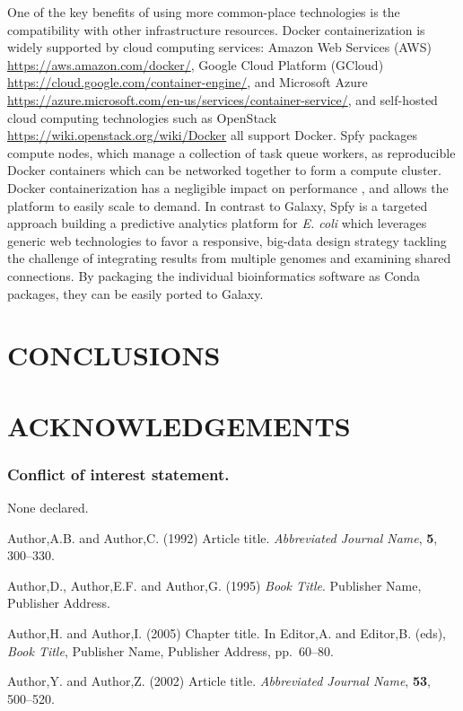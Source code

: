 \documentclass[a4,center,fleqn]{NAR}
\begin{document}
One of the key benefits of using more common-place technologies is the compatibility with other infrastructure resources.
Docker containerization is widely supported by cloud computing services: Amazon Web Services (AWS) \url{https://aws.amazon.com/docker/}, Google Cloud Platform (GCloud) \url{https://cloud.google.com/container-engine/}, and Microsoft Azure \url{https://azure.microsoft.com/en-us/services/container-service/}, and self-hosted cloud computing technologies such as OpenStack \url{https://wiki.openstack.org/wiki/Docker} all support Docker.
Spfy packages compute nodes, which manage a collection of task queue workers, as reproducible Docker containers which can be networked together to form a compute cluster.
Docker containerization has a negligible impact on performance \citep{di2015impact}, and allows the platform to easily scale to demand.
In contrast to Galaxy, Spfy is a targeted approach building a predictive analytics platform for \textit{E. coli} which leverages generic web technologies to favor a responsive, big-data design strategy tackling the challenge \citep{fricke2014bacterial} of integrating results from multiple genomes and examining shared connections.
By packaging the individual bioinformatics software as Conda packages, they can be easily ported to Galaxy.

\section{CONCLUSIONS}

\section{ACKNOWLEDGEMENTS}


\subsubsection{Conflict of interest statement.} None declared.
\newpage


\begin{thebibliography}{4}

Author,A.B. and Author,C. (1992)
Article title.
\textit{Abbreviated Journal Name}, \textbf{5}, 300--330.

Author,D., Author,E.F. and Author,G. (1995)
\textit{Book Title}.
Publisher Name, Publisher Address.

Author,H. and Author,I. (2005)
Chapter title.
In
Editor,A. and Editor,B. (eds),
\textit{Book Title},
Publisher Name, Publisher Address,
pp.\ 60--80.

Author,Y. and Author,Z. (2002)
Article title.
\textit{Abbreviated Journal Name}, \textbf{53}, 500--520.

\end{thebibliography}
\end{document}
